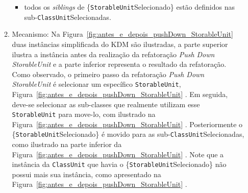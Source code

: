 \begin{enumerate}
\begin{enumerate}
\begin{itemize}
			        \item todos os \textit{siblings} de \{\texttt{StorableUnit}Selecionado\} estão definidos nas sub-\texttt{ClassUnit}Selecionadas.
			    \end{itemize}
			\item Mecanismo: Na Figura~\ref{fig:antes_e_depois_pushDown_StorableUnit} duas instâncias simplificada do KDM são ilustradas, a parte superior ilustra a instância antes da realização da refatoração \textit{Push Down StorableUnit} e a parte inferior representa o resultado da refatoração. Como observado, o primeiro passo da refatoração \textit{Push Down StorableUnit} é selecionar um específico \texttt{StorableUnit}, Figura~\ref{fig:antes_e_depois_pushDown_StorableUnit} . Em seguida, deve-se selecionar as sub-classes que realmente utilizam esse \texttt{StorableUnit} para move-lo, com ilustrado na Figura~\ref{fig:antes_e_depois_pushDown_StorableUnit} . Posteriormente o \{\texttt{StorableUnit}Selecionado\} é movido para as sub-\texttt{ClassUnit}Selecionadas, como ilustrado na parte inferior da Figura~\ref{fig:antes_e_depois_pushDown_StorableUnit} . Note que a instância da \texttt{ClassUnit} que havia o \{\texttt{StorableUnit}Selecionado\} não possui mais sua instância, como apresentado na Figura~\ref{fig:antes_e_depois_pushDown_StorableUnit} .
			

\end{enumerate}
\end{enumerate}
